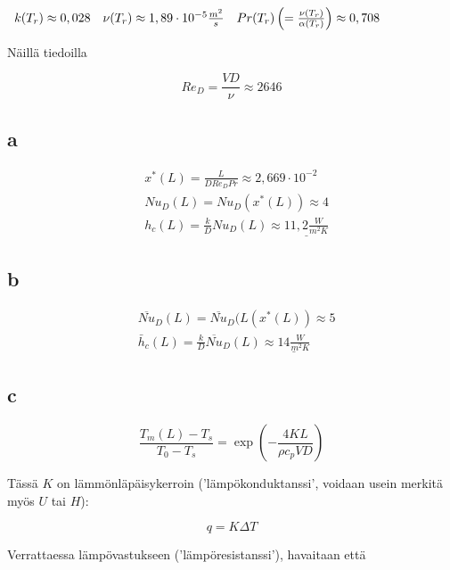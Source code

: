 \documentclass[12pt,a4paper,finnish]{article}
\begin{document}
\begin{math}
 \begin{array}{l l l}
  k(T_r) \approx 0,028 & \nu(T_r) \approx 1,89\cdot10^{-5}\frac{m^2}{s} &
  Pr(T_r) \left(= \frac{\nu(T_r)}{\alpha(T_r)}\right) \approx 0,708
 \end{array}
\end{math}

Näillä tiedoilla

\begin{equation}
 Re_D = \frac{VD}{\nu} \approx 2646
\end{equation}

\subsection{a}

\begin{align}
 &x^*(L) = \frac{L}{DRe_DPr} \approx 2,669\cdot 10^{-2}\\
 &Nu_D(L) = Nu_D(x^*(L)) \approx 4\\
 &h_c(L) = \frac{k}{D}Nu_D(L) \approx \underline{11,2\frac{W}{m^2K}}
\end{align}

\subsection{b}

\begin{align}
 &\overline{Nu}_D(L) = \overline{Nu}_D(L(x^*(L)) \approx 5\\
 &\bar{h}_c(L) = \frac{k}{D}\overline{Nu}_D(L) \approx \underline{14\frac{W}{m^2K}}
\end{align}

\subsection{c}

\begin{equation}
 \frac{T_m(L) - T_s}{T_0 - T_s} = \exp\left(-\frac{4KL}{\rho c_pVD}\right)
\end{equation}

Tässä $K$ on lämmönläpäisykerroin ('lämpökonduktanssi', voidaan usein merkitä myös $U$ tai $H$):

\begin{equation}
 q = K\Delta T
\end{equation}

Verrattaessa lämpövastukseen ('lämpöresistanssi'), havaitaan että
\end{document}
